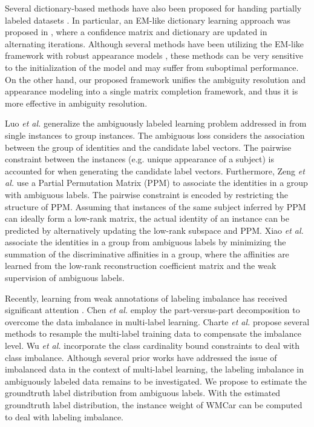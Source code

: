\documentclass[10pt,journal,compsoc]{IEEEtran}
\begin{document}
Several dictionary-based methods have also been proposed for handing partially labeled datasets \cite{Ashish_PR2015,Chen2013,Chen2014all}.  In particular, an EM-like dictionary learning approach was proposed in \cite{Chen2013}, where a confidence matrix and dictionary are updated in alternating iterations. Although several methods have been utilizing the EM-like framework with robust appearance models \cite{Berg2004, Zeng2013,Ashish_PR2015,Chen2013,Chen2014all}, these methods can be very sensitive to the initialization of the model and may suffer from suboptimal performance. On the other hand, our proposed framework unifies the ambiguity resolution and appearance modeling into a single matrix completion framework, and thus it is more effective in ambiguity resolution.





Luo \emph{et al.} \cite{Luo2010} generalize the ambiguously labeled learning problem addressed in \cite{Cour2009} from single instances to group instances. The ambiguous loss considers the association between the group of identities and the candidate label vectors. The pairwise constraint between the instances (e.g. unique appearance of a subject) is accounted for when generating the candidate label vectors.  Furthermore, Zeng \emph{et al.} \cite{Zeng2013} use a Partial Permutation Matrix (PPM) to associate the identities in a group with ambiguous labels.  The pairwise constraint is encoded by restricting the structure of PPM.  Assuming that instances of the same subject inferred by PPM can ideally form a low-rank matrix, the actual identity of an instance can be predicted by alternatively updating the low-rank subspace and PPM. Xiao \emph{et al.} \cite{Xiao2015afn} associate the identities in a group from ambiguous labels by minimizing the summation of the discriminative affinities in a group, where the affinities are learned from the low-rank reconstruction coefficient matrix and the weak supervision of ambiguous labels.



Recently, learning from weak annotations of labeling imbalance has received significant attention \cite{Sahare2012aro,Zhang2015tci}. Chen \emph{et al.} \cite{Chen2006eco} employ the part-versus-part decomposition \cite{Lu2004apv} to overcome the data imbalance in multi-label learning. Charte \emph{et al.} \cite{Charte2015aii} propose several methods to resample the multi-label training data to compensate the imbalance level. Wu \emph{et al.} \cite{Wu2016csm} incorporate the class cardinality bound constraints to deal with class imbalance. Although several prior works have addressed the issue of imbalanced data in the context of multi-label learning, the labeling imbalance in ambiguously labeled data remains to be investigated.
We propose to estimate the groundtruth label distribution from ambiguous labels. With the estimated groundtruth label distribution, the instance weight of WMCar can be computed to deal with labeling imbalance.
\end{document}
